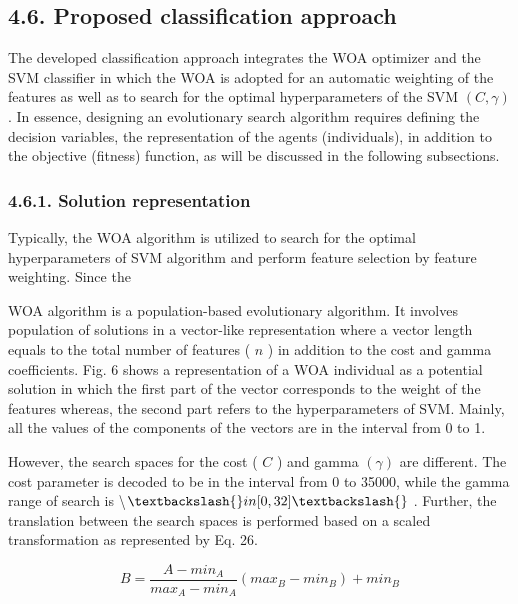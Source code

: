 \documentclass{article}
\begin{document}
\subsection{4.6. Proposed classification approach}

The developed classification approach integrates the WOA optimizer and the SVM classifier in which the WOA is adopted for an automatic weighting of the features as well as to search for the optimal hyperparameters of the SVM $(C,\gamma)$ . In essence, designing an evolutionary search algorithm requires defining the decision variables, the representation of the agents (individuals), in addition to the objective (fitness) function, as will be discussed in the following subsections.

\subsubsection{4.6.1. Solution representation}

Typically, the WOA algorithm is utilized to search for the optimal hyperparameters of SVM algorithm and perform feature selection by feature weighting. Since the

WOA algorithm is a population-based evolutionary algorithm. It involves population of solutions in a vector-like representation where a vector length equals to the total number of features ( $n$ ) in addition to the cost and gamma coefficients. Fig. 6 shows a representation of a WOA individual as a potential solution in which the first part of the vector corresponds to the weight of the features whereas, the second part refers to the hyperparameters of SVM. Mainly, all the values of the components of the vectors are in the interval from 0 to 1.

However, the search spaces for the cost ( $C$ ) and gamma $(\gamma)$ are different. The cost parameter is decoded to be in the interval from 0 to 35000, while the gamma range of search is \textbackslash{}$\textbackslash{}in[0,32]\textbackslash{}$ . Further, the translation between the search spaces is performed based on a scaled transformation as represented by Eq. 26.

\begin{equation}
B=\frac{A-m i n_{A}}{m a x_{A}-m i n_{A}}(m a x_{B}-m i n_{B})+m i n_{B}
\end{equation}
\end{document}
